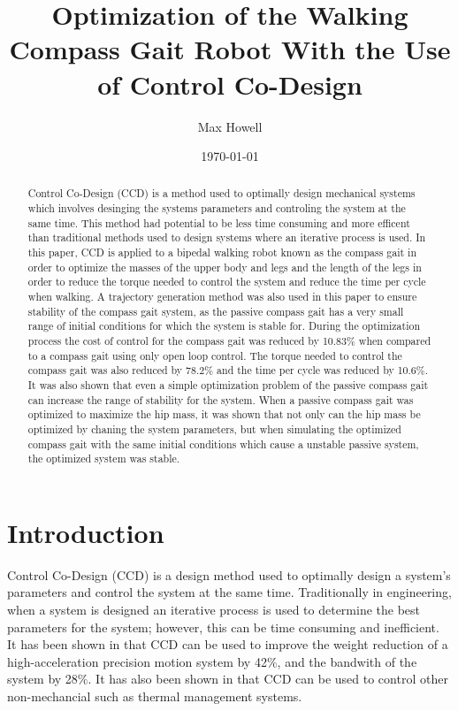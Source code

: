 \documentclass{./springer/svjour3}
\title{Optimization of the Walking Compass Gait Robot With the Use of Control Co-Design}
\author{Max Howell}
\institute{University Of Tennessee Knoxville$^*$ ($^*$corresponding author),
          \email{mhowel30@vols.utk.edu} \\
        \\
          \at MABE, University of Tennessee, Knoxville,
          \at Nathan W. Dougherty Engineering Building, 1512 Middle Dr, Knoxville, TN 37916\\
}
\date{\today}
\begin{document}
\maketitle{}

\begin{abstract}

Control Co-Design (CCD) is a method used to optimally design mechanical systems which involves desinging the systems parameters and controling the system at the same time. This method 
had potential to be less time consuming and more efficent than traditional methods used to design systems where an iterative process is used. In this paper, CCD is applied to a 
bipedal walking robot known as the compass gait in order to optimize the masses of the upper body and legs and the length of the legs in order to reduce the torque needed to control 
the system and reduce the time per cycle when walking. 
A trajectory generation method was also used in this paper to ensure stability of the compass gait system, as the passive compass gait has a very small range of initial conditions for 
which the system is stable for.
During the optimization process the cost of control for the compass gait was reduced by 10.83$\%$
when compared to a compass gait using only open loop control. The torque needed to control the compass gait was also reduced by 78.2$\%$ and the time per cycle was reduced by 10.6$\%$.
It was also shown that even a simple optimization problem of the passive compass gait can increase the range of stability for the system. When a passive compass gait was optimized to maximize the hip 
mass, it was shown that not only can the hip mass be optimized by chaning the system parameters, but when simulating the optimized compass gait with 
the same initial conditions which cause a unstable passive system, the optimized system was stable.
  
\end{abstract} 

\section{Introduction}
Control Co-Design (CCD) is a design method used to optimally design a system's parameters and control the system at the same time. Traditionally in engineering,
when a system is designed an iterative process is used to determine the best parameters for the system; however, this can be time consuming and inefficient. 
It has been shown in \cite{wu2022control} that CCD can be used to improve the weight reduction of a high-acceleration precision motion system by 42$\%$, and 
the bandwith of the system by 28$\%$. It has also been shown in \cite{Mandali2023} that CCD can be used to control other non-mechancial such as thermal 
management systems. 
\end{document}

